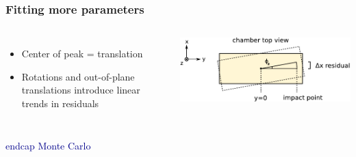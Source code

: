 \documentclass[compress]{beamer}
\begin{document}
\begin{frame}
\frametitle{Fitting more parameters}

\begin{columns}
\begin{itemize}
\item Center of peak = translation
\item Rotations and out-of-plane translations introduce linear trends in residuals
\end{itemize}

\vspace{0.2 cm}

\vspace{0.2 cm}
\includegraphics[width=\linewidth]{phiz_diagram.pdf}
\end{columns}

\begin{columns}
\tiny \textcolor{darkblue}{endcap Monte Carlo}


\end{columns}
\end{frame}
\end{document}
